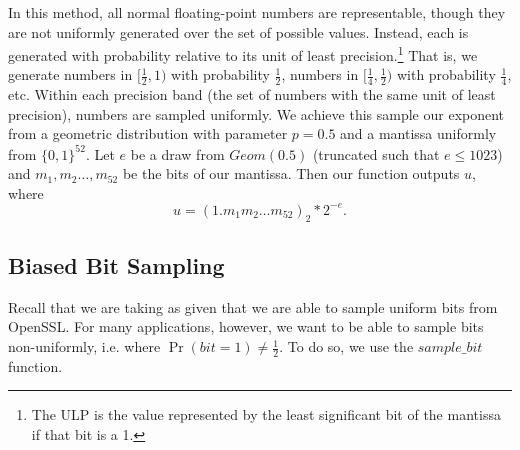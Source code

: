 \documentclass[11pt]{scrartcl} %
\begin{document}
In this method, all normal floating-point numbers are representable, though they are not uniformly generated
over the set of possible values.
Instead, each is generated with probability relative to its unit of least precision.\footnote{The ULP is the value
represented by the least significant bit of the mantissa if that bit is a 1.}
That is, we generate numbers in $[\frac{1}{2},1)$ with probability $\frac{1}{2}$, numbers in $[\frac{1}{4}, \frac{1}{2})$
with probability $\frac{1}{4}$, etc. Within each precision band (the set of numbers with the same unit
of least precision), numbers are sampled uniformly.
We achieve this sample our exponent from a geometric distribution with parameter $p = 0.5$ and a mantissa uniformly from $\{0,1\}^{52}$.
Let $e$ be a draw from $Geom(0.5)$ (truncated such that $e \leq 1023$) and $m_1, m_2 \hdots, m_{52}$ be the bits of our mantissa. Then our function outputs $u$, where
\[ u = (1.m_1m_2 \hdots m_{52})_2 * 2^{-e}. \]

\subsection{Biased Bit Sampling}
Recall that we are taking as given that we are able to sample uniform bits from OpenSSL.
For many applications, however, we want to be able to sample bits non-uniformly,
i.e. where $\Pr(bit = 1) \neq \frac{1}{2}$. To do so, we use the $sample\_bit$ function.
\end{document}
